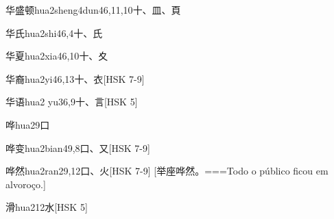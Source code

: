 \begin{EntryWithPhonetic}{华盛顿}{hua2sheng4dun4}{6,11,10}{⼗、⽫、⾴}
\end{EntryWithPhonetic}

\begin{EntryWithPhonetic}{华氏}{hua2shi4}{6,4}{⼗、⽒}
\end{EntryWithPhonetic}

\begin{EntryWithPhonetic}{华夏}{hua2xia4}{6,10}{⼗、⼢}
\end{EntryWithPhonetic}

\begin{EntryWithPhonetic}{华裔}{hua2yi4}{6,13}{⼗、⾐}[HSK 7-9]
\end{EntryWithPhonetic}

\begin{EntryWithPhonetic}{华语}{hua2 yu3}{6,9}{⼗、⾔}[HSK 5]
\end{EntryWithPhonetic}

\begin{EntryWithPhonetic}{哗}{hua2}{9}{⼝}
\end{EntryWithPhonetic}

\begin{EntryWithPhonetic}{哗变}{hua2bian4}{9,8}{⼝、⼜}[HSK 7-9]
\end{EntryWithPhonetic}

\begin{EntryWithPhonetic}{哗然}{hua2ran2}{9,12}{⼝、⽕}[HSK 7-9]
  [举座哗然。===Todo o público ficou em alvoroço.]
\end{EntryWithPhonetic}

\begin{EntryWithPhonetic}{滑}{hua2}{12}{⽔}[HSK 5]
\end{EntryWithPhonetic}

